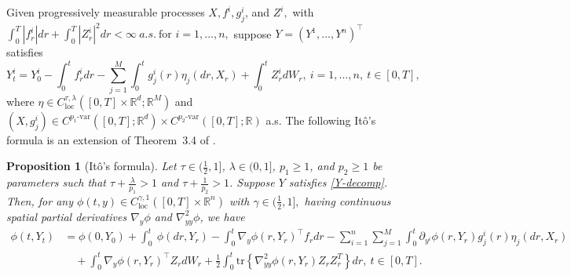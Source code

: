 \documentclass[11pt,reqno]{amsart}
\newtheorem{proposition}{Proposition}[section]
\numberwithin{equation}{section}
\begin{document}
Given progressively measurable
processes $X, f^{i}, g^{i}_{j}$, and $Z^{i},$ with $\int_0^T|f^{i}_{r}|dr + \int_{0}^{T}|Z^{i}_{r}|^{2} dr < \infty \ a.s.\ \text{for } i=1,...,n,$ suppose $Y=\left(Y^{1},...,Y^{n}\right)^{\top}$ satisfies 
\begin{equation}\label{Y-decomp}	
Y^{i}_{t} = Y^{i}_{0} - \int_{0}^{t} f^{i}_{r} dr - \sum_{j=1}^{M}\int_{0}^{t}g^{i}_{j}(r) \eta_{j}(dr,X_{r}) + \int_{0}^{t}Z^{i}_{r}dW_{r} ,\ i=1,...,n,\ t\in[0,T],
\end{equation}
where $\eta \in C^{\tau,\lambda}_{\text{loc}}([0,T]\times\mathbb{R}^{d};\mathbb{R}^{M})$ and $(X, g^{i}_{j}) \in C^{p_{1}\text{-var}}([0,T];\mathbb{R}^{d}) \times C^{p_{2}\text{-var}}([0,T];\mathbb{R})$ a.s. The following It\^o's formula is an extension of Theorem~3.4 of \cite{HuLe}.


\begin{proposition}[It\^o's formula]\label{prop:Ito's formula} Let $ \tau\in(\frac12, 1]$, $ \lambda\in(0,1]$, $p_1\ge 1$, and  $p_2\ge1$ be parameters such that $\tau + \frac{\lambda}{p_{1}}>1$ and $\tau + \frac{1}{p_{2}}>1$.  Suppose $Y$ satisfies \eqref{Y-decomp}. Then, for any $\phi(t,y)\in C^{\gamma,1}_{\mathrm{loc}}([0,T]\times\mathbb{R}^{n})$ with $\gamma\in (\frac12, 1],$ having continuous spatial partial derivatives $\nabla_{y}\phi$ and $\nabla^{2}_{yy}\phi$, we have
\begin{equation*}
\begin{aligned}
\phi(t,Y_{t}) &=   \phi(0,Y_{0}) + \int_{0}^{t}\ \phi(dr,Y_{r}) -\int_{0}^{t}\nabla_{y}\phi(r,Y_{r})^{\top} f_{r} dr - \sum_{i=1}^{n}\sum_{j=1}^{M}\int_{0}^{t} \partial_{y^i}\phi(r,Y_{r}) g^{i}_{j}(r)\eta_{j}(dr,X_{r})\\
&\quad + \int_{0}^{t}  \nabla_{y}\phi(r,Y_{r})^{\top} Z_{r} dW_{r} + \frac{1}{2}\int_{0}^{t}\text{tr}\left\{\nabla^{2}_{yy}  \phi(r,Y_{r})Z_{r}Z^{T}_{r}\right\} dr,\ t\in[0,T].
\end{aligned}
\end{equation*}
\end{proposition}
\end{document}
